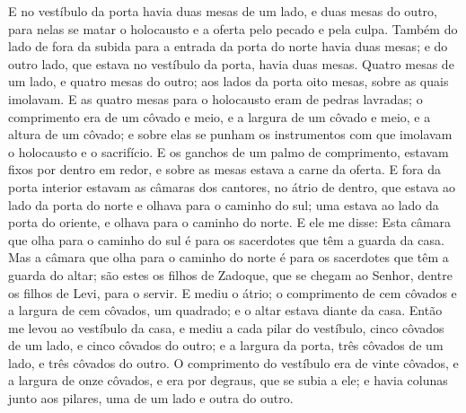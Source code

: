 E no vestíbulo da porta havia duas mesas de um lado, e duas mesas
do outro, para nelas se matar o holocausto e a oferta pelo pecado e
pela culpa. Também do lado de fora da subida para a entrada
da porta do norte havia duas mesas; e do outro lado, que estava no
vestíbulo da porta, havia duas mesas. Quatro mesas de um
lado, e quatro mesas do outro; aos lados da porta oito mesas, sobre
as quais imolavam. E as quatro mesas para o holocausto eram
de pedras lavradas; o comprimento era de um côvado e meio, e a
largura de um côvado e meio, e a altura de um côvado; e sobre elas
se punham os instrumentos com que imolavam o holocausto e o
sacrifício. E os ganchos de um palmo de comprimento, estavam
fixos por dentro em redor, e sobre as mesas estava a carne da
oferta. E fora da porta interior estavam as câmaras dos
cantores, no átrio de dentro, que estava ao lado da porta do norte e
olhava para o caminho do sul; uma estava ao lado da porta do
oriente, e olhava para o caminho do norte. E ele me disse:
Esta câmara que olha para o caminho do sul é para os sacerdotes que
têm a guarda da casa. Mas a câmara que olha para o caminho do
norte é para os sacerdotes que têm a guarda do altar; são estes os
filhos de Zadoque, que se chegam ao Senhor, dentre os filhos de
Levi, para o servir. E mediu o átrio; o comprimento de cem
côvados e a largura de cem côvados, um quadrado; e o altar estava
diante da casa. Então me levou ao vestíbulo da casa, e mediu
a cada pilar do vestíbulo, cinco côvados de um lado, e cinco côvados
do outro; e a largura da porta, três côvados de um lado, e três
côvados do outro. O comprimento do vestíbulo era de vinte
côvados, e a largura de onze côvados, e era por degraus, que se
subia a ele; e havia colunas junto aos pilares, uma de um lado e
outra do outro.

\medskip

